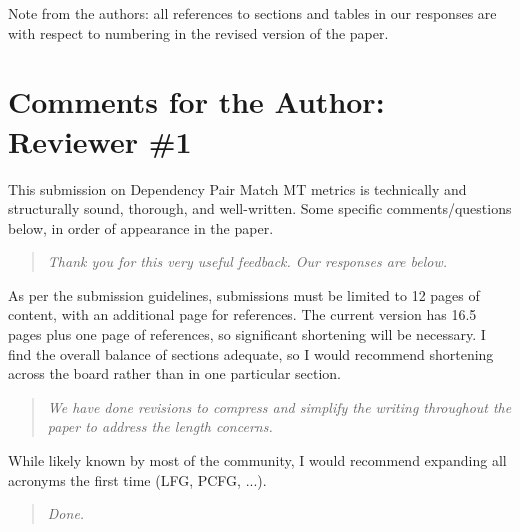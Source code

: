 \documentclass[letterpaper,12pt]{article}
\newenvironment{response}
{\begin{quotation} \it}
  {\end{quotation}}
\begin{document}
Note from the authors: all references to sections and tables in our responses are with respect to numbering in the revised version of the paper.

\section{Comments for the Author: Reviewer \#1}
\label{sec:reviewer1}

This submission on Dependency Pair Match MT metrics is technically and
structurally sound, thorough, and well-written.  Some specific
comments/questions below, in order of appearance in the paper.
\begin{response}
  Thank you for this very useful feedback. Our responses are below.
\end{response}
As per the submission guidelines, submissions must be limited to 12
pages of content, with an additional page for references.  The current
version has 16.5 pages plus one page of references, so significant
shortening will be necessary.  I find the overall balance of sections
adequate, so I would recommend shortening across the board rather than
in one particular section.
\begin{response}
  We have done revisions to compress and simplify the writing
  throughout the paper to address the length concerns.
\end{response}
While likely known by most of the community, I would recommend
expanding all acronyms the first time (LFG, PCFG, ...).
\begin{response}
  Done.
\end{response}
\end{document}
